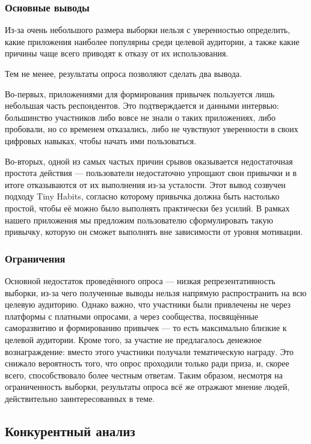 \documentclass[pdflatex,sn-mathphys-num]{sn-jnl}%
\theoremstyle{thmstyleone}%
\theoremstyle{thmstyletwo}%
\theoremstyle{thmstylethree}%
\begin{document}
\subsubsection{Основные выводы}

Из-за очень небольшого размера выборки нельзя с уверенностью определить, какие приложения наиболее популярны среди целевой аудитории, а также какие причины чаще всего приводят к отказу от их использования.

Тем не менее, результаты опроса позволяют сделать два вывода. 

Во-первых, приложениями для формирования привычек пользуется лишь небольшая часть респондентов. Это подтверждается и данными интервью: большинство участников либо вовсе не знали о таких приложениях, либо пробовали, но со временем отказались, либо не чувствуют уверенности в своих цифровых навыках, чтобы начать ими пользоваться.

Во-вторых, одной из самых частых причин срывов оказывается недостаточная простота действия — пользователи недостаточно упрощают свои привычки и в итоге отказываются от их выполнения из-за усталости. Этот вывод созвучен подходу Tiny Habits, согласно которому привычка должна быть настолько простой, чтобы её можно было выполнять практически без усилий. В рамках нашего приложения мы предложим пользователю сформулировать такую привычку, которую он сможет выполнять вне зависимости от уровня мотивации.

\subsubsection{Ограничения}

Основной недостаток проведённого опроса — низкая репрезентативность выборки, из-за чего полученные выводы нельзя напрямую распространить на всю целевую аудиторию. Однако важно, что участники были привлечены не через платформы с платными опросами, а через сообщества, посвящённые саморазвитию и формированию привычек — то есть максимально близкие к целевой аудитории. Кроме того, за участие не предлагалось денежное вознаграждение: вместо этого участники получали тематическую награду. Это снижало вероятность того, что опрос проходили только ради приза, и, скорее всего, способствовало более честным ответам. Таким образом, несмотря на ограниченность выборки, результаты опроса всё же отражают мнение людей, действительно заинтересованных в теме.

\subsection{Конкурентный анализ}\label{Competitor Analysis}
\end{document}
